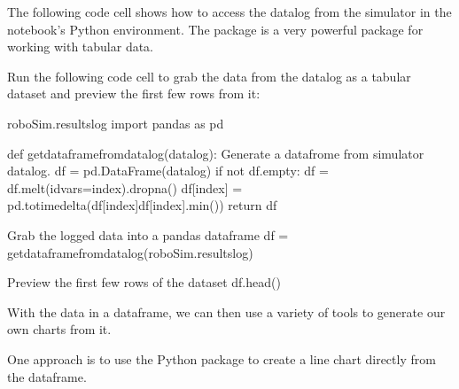\documentclass[letterpaper,10pt,english]{sphinxmanual}
\begin{document}

The following code cell shows how to access the datalog from the simulator in the notebook’s Python environment. The  package is a very powerful package for working with tabular data.


Run the following code cell to grab the data from the datalog as a tabular dataset and preview the first few rows from it:

{
\begin{sphinxVerbatim}[commandchars=\\\{\}]
\llap{\color{nbsphinxin}[ ]:\,\hspace{\fboxrule}\hspace{\fboxsep}}\PYGZsh{}roboSim.results\PYGZus{}log
import pandas as pd

def get\PYGZus{}dataframe\PYGZus{}from\PYGZus{}datalog(datalog):
    \PYGZdq{}\PYGZdq{}\PYGZdq{}Generate a datafrome from simulator datalog.\PYGZdq{}\PYGZdq{}\PYGZdq{}
    df = pd.DataFrame(datalog)
    if not df.empty:
        df = df.melt(id\PYGZus{}vars=\PYGZsq{}index\PYGZsq{}).dropna()
        df[\PYGZsq{}index\PYGZsq{}] = pd.to\PYGZus{}timedelta(df[\PYGZsq{}index\PYGZsq{}]\PYGZhy{}df[\PYGZsq{}index\PYGZsq{}].min())
    return df

\PYGZsh{}Grab the logged data into a pandas dataframe
df = get\PYGZus{}dataframe\PYGZus{}from\PYGZus{}datalog(roboSim.results\PYGZus{}log)

\PYGZsh{}Preview the first few rows of the dataset
df.head()
\end{sphinxVerbatim}
}

With the data in a  dataframe, we can then use a variety of tools to generate our own charts from it.

One approach is to use the  Python package to create a line chart directly from the dataframe.
\end{document}
